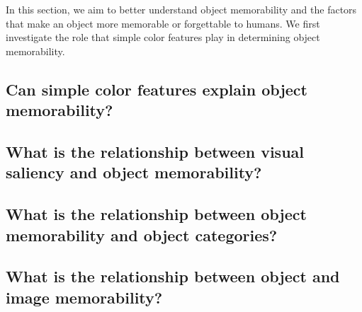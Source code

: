 In this section, we aim to better understand object memorability and the factors that make an object more memorable or forgettable to humans. We first investigate the role that simple color features play in determining object memorability. 

\subsection{Can simple color features explain object memorability?}



\subsection{What is the relationship between visual saliency and object memorability?}



\subsection{What is the relationship between object memorability and object categories?}



\subsection{What is the relationship between object and image memorability?}

 